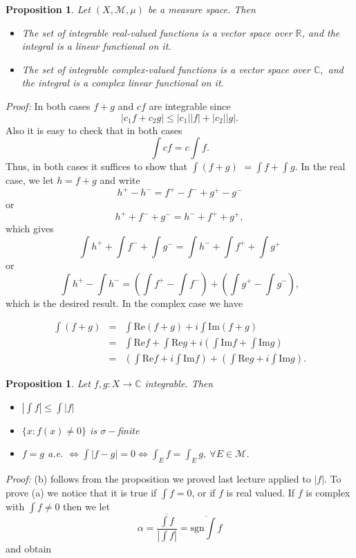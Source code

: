 \documentclass[12pt]{report}
\newtheorem{prop}[theorem]{Proposition}
\begin{document}
\begin{prop}  Let $(X, \mathcal{M}, \mu)$ be a measure
space.  Then
\begin{itemize}
\item[a)] \textit{ The set of integrable real-valued functions is a
vector space over
$\mathbb{R}$, and the integral is a linear functional on it.}
\item[b)]  \textit{The set of integrable complex-valued functions is a
vector space over
$\mathbb{C},$ and the integral is a complex linear functional on it.}
\end{itemize}
\end{prop}
\textit{Proof:} In both cases $f + g$ and $cf$ are integrable
since
\[ |c_1 f + c_2 g| \le |c_1| |f| + |c_2| |g|.
\] 
Also it is easy to check that in both cases
\[
\int c f = c\int f.
\]
Thus, in both cases it suffices to show that  
$\int (f + g)$ $=\int f +\int g$. 
In the real case, we let $h = f + g$ and write 
\[ h^+ - h^- = f^+ - f^- + g^+ - g^-
\] or
\[ h^+ + f^- + g^- = h^- + f^+ + g^+,
\] which gives
\[
\int h^+ + \int f^- + \int g^- = \int h^- + \int f^+ + \int g^+
\] or
\[
\int h^+ - \int h^- = \left ( \int f^+ - \int f^- \right ) + \left ( \int g^+ -
\int g^-\right ),
\] which is the desired result.  In the complex case we have

\begin{eqnarray*}
\int(f+g) &=& \int \mbox{Re}(f+g) + i \int \mbox{Im}(f + g)\\ &=& \int
\mbox{Re} f + \int \mbox{Re} g + i \left ( \int \mbox{Im}f + \int
\mbox{Im}g
\right )\\ &=& \left ( \int \mbox{Re} f + i \int \mbox{Im} f \right ) +
\left ( \int \mbox{Re}g + i\int \mbox{Im} g\right ). 
\end{eqnarray*}


\begin{prop} Let $f, g: X \longrightarrow \mathbb{C}$
integrable.  Then
\begin{itemize}
\item[a. ]  $\left |\int f \right | \le \int |f|$
\item[b. ] $\{x: f(x) \ne 0\} $ \textit{is} $\sigma-$finite
\item[c. ] $f = g$ a.e. $\Longleftrightarrow \int |f-g| = 0
\Longleftrightarrow \int_E f = \int_Eg, \ \forall E \in \mathcal{M}$.
\end{itemize}
\end{prop}
\textit{Proof:}  
(b) follows from the proposition we proved last lecture
applied to
$|f|$.  To prove (a) we notice that it is true if $\int f = 0$, or if $f$ is real
valued.  If
$f$ is complex with $\int f \ne 0$ then we let
\[
\alpha = \frac{\overline{\int f}}{|\int f|} = \overline{\text{sgn} \int
f}
\] and obtain
\end{document}

